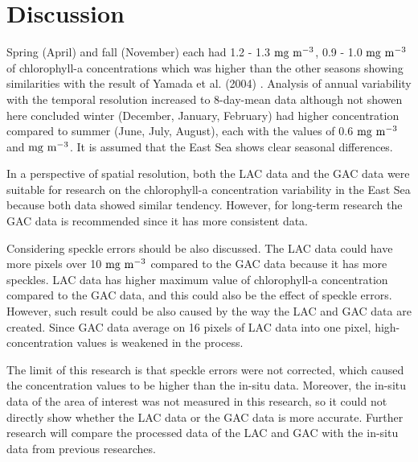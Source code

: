 \section{Discussion}

Spring (April) and fall (November) each had 1.2 - 1.3 $\rm mg~m^{-3}$, 0.9 - 1.0 $\rm mg~m^{-3}$ of chlorophyll-a concentrations which was higher than the other seasons showing similarities with the result of Yamada et al. (2004) \cite{yamada2004seasonal}. Analysis of annual variability with the temporal resolution increased to 8-day-mean data although not showen here concluded winter (December, January, February) had higher concentration compared to summer (June, July, August), each with the values of 0.6 $\rm mg~m^{-3}$ and $\rm mg~m^{-3}$. It is assumed that the East Sea shows clear seasonal differences.

In a perspective of spatial resolution, both the LAC data and the GAC data were suitable for research on the chlorophyll-a concentration variability in the East Sea because both data showed similar tendency. However, for long-term research the GAC data is recommended since it has more consistent data. 

Considering speckle errors should be also discussed. The LAC data could have more pixels over 10 $\rm mg~m^{-3}$ compared to the GAC data because it has more speckles. LAC data has higher maximum value of chlorophyll-a concentration compared to the GAC data, and this could also be the effect of speckle errors. However, such result could be also caused by the way the LAC and GAC data are created. Since GAC data average on 16 pixels of LAC data into one pixel, high-concentration values is weakened in the process. 

The limit of this research is that speckle errors were not corrected, which caused the concentration values to be higher than the in-situ data. Moreover, the in-situ data of the area of interest was not measured in this research, so it could not directly show whether the LAC data or the GAC data is more accurate. Further research will compare the processed data of the LAC and GAC with the in-situ data from previous researches.
